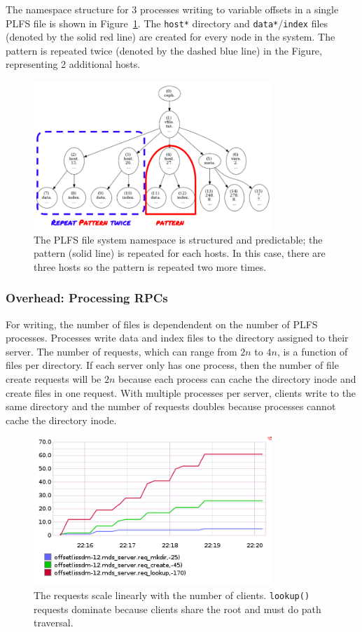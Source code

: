 The namespace structure for 3 processes writing to variable offsets in a single
PLFS file is shown in Figure~\ref{fig:tree_plfs}. The \texttt{host*} directory
and \texttt{data*}/\texttt{index} files (denoted by the solid red line) are
created for every node in the system. The pattern is repeated twice (denoted by
the dashed blue line) in the Figure, representing 2 additional hosts.

\begin{figure}[tb]
\centering
  \includegraphics[width=90mm]{figures/tree_plfs.png} 
  \caption{The PLFS file system namespace is structured and predictable; the
  pattern (solid line) is repeated for each hosts. In this case, there are three
  hosts so the pattern is repeated two more times. 
  }\label{fig:tree_plfs}
\end{figure}

\subsubsection{Overhead: Processing RPCs}

For writing, the number of files is dependendent on the number of PLFS
processes. Processes write data and index files to the directory assigned to
their server. The number of requests, which can range from \(2n\) to \(4n\), is
a function of files per directory.  If each server only has one process, then
the number of file create requests will be \(2n\) because each process can
cache the directory inode and create files in one request. With multiple
processes per server, clients write to the same directory and the number of
requests doubles because processes cannot cache the directory inode.

\begin{figure}[tb]
\centering
  \includegraphics[width=90mm]{figures/prob_reqs.png} 
  \caption{The requests scale linearly with the number of clients.
  \texttt{lookup()} requests dominate because clients share the root and must do
  path traversal.
  }\label{fig:arch}
\end{figure}

